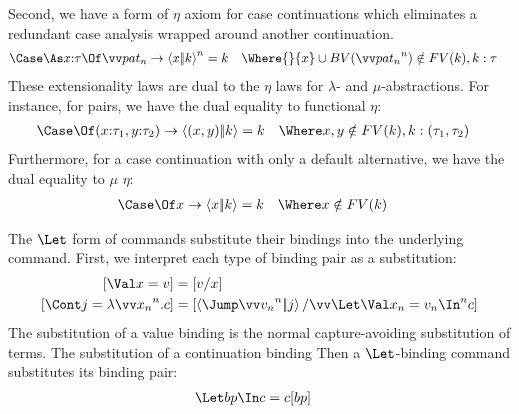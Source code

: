 \documentclass{article}
\begin{document}
Second, we have a form of $\eta$ axiom for case continuations which eliminates
a redundant case analysis wrapped around another continuation.
\begin{align*}
  \caseas{\ann{x}{\ty}}{\vect[n]{\alt{\pat_n}{\cut{x}{\ko}}}}
  &=
  \ko
  &
  \Where{}
  \{x\} \cup BV(\vect[n]{\pat_n}) &\notin FV(\ko)
  ,
  \ko : \ty
\end{align*}
These extensionality laws are dual to the $\eta$ laws for $\lambda$- and
$\mu$-abstractions.  For instance, for pairs, we have the dual equality to
functional $\eta$:
\begin{align*}
  \Case\Of \alt{(\ann{x}{\ty_1},\ann{y}{\ty_2})}{\cut{(x,y)}{\ko}}
  &=
  \ko
  &
  \Where
  x,y &\notin FV(\ko)
  ,
  \ko : (\ty_1, \ty_2)
\end{align*}
Furthermore, for a case continuation with only a default alternative, we have
the dual equality to $\mu$ $\eta$:
\begin{align*}
  \Case\Of \alt{x}{\cut{x}{\ko}}
  &=
  \ko
  &
  \Where
  x &\notin FV(\ko)
\end{align*}

The $\Let$ form of commands substitute their bindings into the underlying
command.  First, we interpret each type of binding pair as a substitution:
\begin{align*}
  \subp{\bindv{x}{\tm}} &= \subst{x}{\tm}
  \\
  \subp{\bindk{j}{\fnk{\vect[n]{x_n}}\cmd}}
  &=
  \subst{\vect[n]{\Let \nonrec{\bindv{x_n}{\tm_n}} \In} \cmd}{\jump{\vect[n]{\tm_n}}{j}}
\end{align*}
The substitution of a value binding is the normal capture-avoiding substitution
of terms.  The substitution of a continuation binding  Then a $\Let$-binding command substitutes its binding pair:
\begin{align*}
  \Let \nonrec{\bp} \In \cmd
  &=
  \cmd\subp{\bp}
\end{align*}
\end{document}
